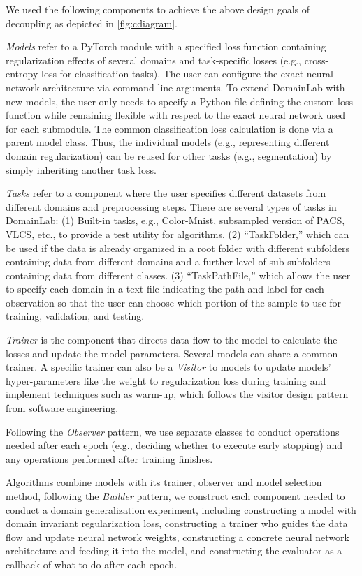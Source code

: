 We used the following components to achieve the above design goals of
decoupling as depicted in \autoref{fig:cdiagram}.

\emph{Models} refer to a PyTorch module with a specified loss function
containing regularization effects of several domains and task-specific
losses (e.g., cross-entropy loss for classification tasks). The user can
configure the exact neural network architecture via command line
arguments. To extend DomainLab with new models, the user only needs to
specify a Python file defining the custom loss function while remaining
flexible with respect to the exact neural network used for each
submodule. The common classification loss calculation is done via a
parent model class. Thus, the individual models (e.g., representing
different domain regularization) can be reused for other tasks (e.g.,
segmentation) by simply inheriting another task loss.

\emph{Tasks} refer to a component where the user specifies different
datasets from different domains and preprocessing steps. There are
several types of tasks in DomainLab: (1) Built-in tasks, e.g.,
Color-Mnist, subsampled version of PACS, VLCS, etc., to provide a test
utility for algorithms. (2) ``TaskFolder,'' which can be used if the
data is already organized in a root folder with different subfolders
containing data from different domains and a further level of
sub-subfolders containing data from different classes. (3)
``TaskPathFile,'' which allows the user to specify each domain in a text
file indicating the path and label for each observation so that the user
can choose which portion of the sample to use for training, validation,
and testing.

\emph{Trainer} is the component that directs data flow to the model to
calculate the losses and update the model parameters. Several models can
share a common trainer. A specific trainer can also be a \emph{Visitor}
to models to update models' hyper-parameters like the weight to
regularization loss during training and implement techniques such as
warm-up, which follows the visitor design pattern from software
engineering.

Following the \emph{Observer} pattern, we use separate classes to
conduct operations needed after each epoch (e.g., deciding whether to
execute early stopping) and any operations performed after training
finishes.

Algorithms combine models with its trainer, observer and model selection
method, following the \emph{Builder} pattern, we construct each
component needed to conduct a domain generalization experiment,
including constructing a model with domain invariant regularization
loss, constructing a trainer who guides the data flow and update neural
network weights, constructing a concrete neural network architecture and
feeding it into the model, and constructing the evaluator as a callback
of what to do after each epoch.

